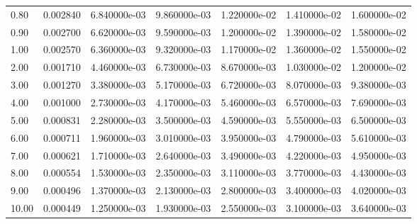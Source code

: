 \begin{tabular}{lrrrrrr}
0.80  &  0.002840 &  6.840000e-03 &  9.860000e-03 &  1.220000e-02 &  1.410000e-02 &  1.600000e-02 \\
0.90  &  0.002700 &  6.620000e-03 &  9.590000e-03 &  1.200000e-02 &  1.390000e-02 &  1.580000e-02 \\
1.00  &  0.002570 &  6.360000e-03 &  9.320000e-03 &  1.170000e-02 &  1.360000e-02 &  1.550000e-02 \\
2.00  &  0.001710 &  4.460000e-03 &  6.730000e-03 &  8.670000e-03 &  1.030000e-02 &  1.200000e-02 \\
3.00  &  0.001270 &  3.380000e-03 &  5.170000e-03 &  6.720000e-03 &  8.070000e-03 &  9.380000e-03 \\
4.00  &  0.001000 &  2.730000e-03 &  4.170000e-03 &  5.460000e-03 &  6.570000e-03 &  7.690000e-03 \\
5.00  &  0.000831 &  2.280000e-03 &  3.500000e-03 &  4.590000e-03 &  5.550000e-03 &  6.500000e-03 \\
6.00  &  0.000711 &  1.960000e-03 &  3.010000e-03 &  3.950000e-03 &  4.790000e-03 &  5.610000e-03 \\
7.00  &  0.000621 &  1.710000e-03 &  2.640000e-03 &  3.490000e-03 &  4.220000e-03 &  4.950000e-03 \\
8.00  &  0.000554 &  1.530000e-03 &  2.350000e-03 &  3.110000e-03 &  3.770000e-03 &  4.430000e-03 \\
9.00  &  0.000496 &  1.370000e-03 &  2.130000e-03 &  2.800000e-03 &  3.400000e-03 &  4.020000e-03 \\
10.00 &  0.000449 &  1.250000e-03 &  1.930000e-03 &  2.550000e-03 &  3.100000e-03 &  3.640000e-03 \\
\bottomrule
\end{tabular}
